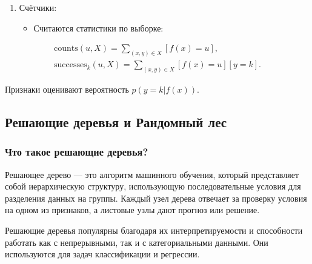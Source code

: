 \begin{enumerate}
\begin{enumerate}
\item
  Счётчики:

  \begin{itemize}
  \tightlist
  \item
    Считаются статистики по выборке:
  \end{itemize}
\end{enumerate}

\begin{equation}
    \begin{aligned}
    \text{counts}(u, X) = \sum_{(x, y) \in X} [f(x) = u], \\\text{successes}_k(u, X) = \sum_{(x, y) \in X} [f(x) = u][y = k].        
    \end{aligned}
\end{equation}

    Признаки оценивают вероятность \(p(y = k | f(x))\).



\hypertarget{ux440ux435ux448ux430ux44eux449ux438ux435-ux434ux435ux440ux435ux432ux44cux44f-ux438-ux440ux430ux43dux434ux43eux43cux43dux44bux439-ux43bux435ux441}{%
\subsection*{Решающие деревья и Рандомный
лес}\label{ux440ux435ux448ux430ux44eux449ux438ux435-ux434ux435ux440ux435ux432ux44cux44f-ux438-ux440ux430ux43dux434ux43eux43cux43dux44bux439-ux43bux435ux441}}

\hypertarget{ux447ux442ux43e-ux442ux430ux43aux43eux435-ux440ux435ux448ux430ux44eux449ux438ux435-ux434ux435ux440ux435ux432ux44cux44f}{%
\subsubsection*{Что такое решающие
деревья?}\label{ux447ux442ux43e-ux442ux430ux43aux43eux435-ux440ux435ux448ux430ux44eux449ux438ux435-ux434ux435ux440ux435ux432ux44cux44f}}

Решающее дерево --- это алгоритм машинного обучения, который
представляет собой иерархическую структуру, использующую
последовательные условия для разделения данных на группы. Каждый узел
дерева отвечает за проверку условия на одном из признаков, а листовые
узлы дают прогноз или решение.

Решающие деревья популярны благодаря их интерпретируемости и способности
работать как с непрерывными, так и с категориальными данными. Они
используются для задач классификации и регрессии.


\end{enumerate}
